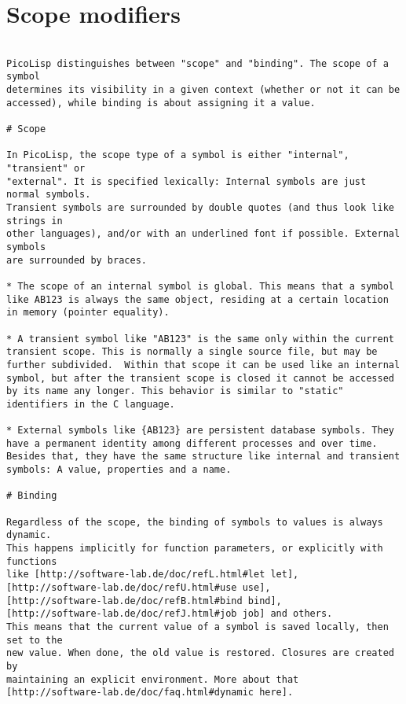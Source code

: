 \section*{Scope modifiers}

\begin{verbatim}

PicoLisp distinguishes between "scope" and "binding". The scope of a symbol
determines its visibility in a given context (whether or not it can be
accessed), while binding is about assigning it a value.

# Scope

In PicoLisp, the scope type of a symbol is either "internal", "transient" or
"external". It is specified lexically: Internal symbols are just normal symbols.
Transient symbols are surrounded by double quotes (and thus look like strings in
other languages), and/or with an underlined font if possible. External symbols
are surrounded by braces.

* The scope of an internal symbol is global. This means that a symbol like AB123 is always the same object, residing at a certain location in memory (pointer equality).

* A transient symbol like "AB123" is the same only within the current transient scope. This is normally a single source file, but may be further subdivided.  Within that scope it can be used like an internal symbol, but after the transient scope is closed it cannot be accessed by its name any longer. This behavior is similar to "static" identifiers in the C language.

* External symbols like {AB123} are persistent database symbols. They have a permanent identity among different processes and over time. Besides that, they have the same structure like internal and transient symbols: A value, properties and a name.

# Binding

Regardless of the scope, the binding of symbols to values is always dynamic.
This happens implicitly for function parameters, or explicitly with functions
like [http://software-lab.de/doc/refL.html#let let],
[http://software-lab.de/doc/refU.html#use use],
[http://software-lab.de/doc/refB.html#bind bind],
[http://software-lab.de/doc/refJ.html#job job] and others.
This means that the current value of a symbol is saved locally, then set to the
new value. When done, the old value is restored. Closures are created by
maintaining an explicit environment. More about that
[http://software-lab.de/doc/faq.html#dynamic here].

\end{verbatim}

